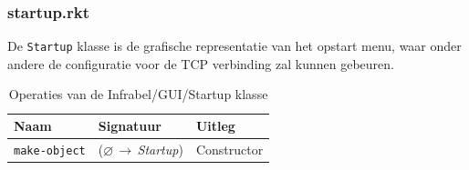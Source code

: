 \documentclass[a4paper, 11pt]{article}
\newcommand{\naar}{\,$\rightarrow$\,}
\renewcommand{\empty}{$\varnothing$}
\newcommand{\<}{\scriptsize\textless\normalsize}
\renewcommand{\>}{\scriptsize\textgreater\normalsize}
\begin{document}
\subsubsection{startup.rkt} %
De \texttt{Startup} klasse is de grafische representatie van het opstart menu, waar onder andere de configuratie voor de TCP verbinding zal kunnen gebeuren.
\begin{table}[H]
	\begin{center}
		{
		\begin{tabular}{|l l l|}
			\hline
			\textbf{Naam} & \textbf{Signatuur} & \textbf{Uitleg}\\
			\hline
			\texttt{make-object} & (\empty \naar \textit{Startup}) & Constructor\\
			\hline
		\end{tabular}}
		\caption{Operaties van de Infrabel/GUI/Startup klasse}
	\end{center}
\end{table}

\end{document}

